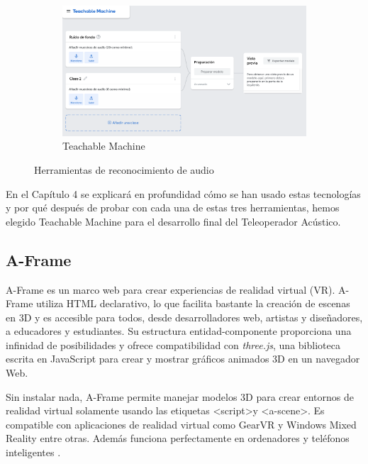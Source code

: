\begin{figure}[H]
\begin{subfigure}{.3\linewidth}
       \includegraphics[width=1\textwidth, height=0.7\textwidth]{chapters/images/tm.png}
        \caption{Teachable Machine}
    \end{subfigure}
    \caption{Herramientas de reconocimiento de audio}
\end{figure}


En el Capítulo 4 se explicará en profundidad cómo se han usado estas tecnologías y por qué después de probar con cada una de estas tres herramientas, hemos elegido Teachable Machine para el desarrollo final del Teleoperador Acústico.


\subsection{A-Frame}

A-Frame es un marco web para crear experiencias de realidad virtual (VR). A-Frame utiliza HTML declarativo, lo que facilita bastante la creación de escenas en 3D y es accesible para todos, desde desarrolladores web, artistas y diseñadores, a educadores y estudiantes. Su estructura entidad-componente proporciona una infinidad de posibilidades y ofrece compatibilidad con \textit{three.js}, una biblioteca  escrita en JavaScript para crear y mostrar gráficos animados 3D en un navegador Web. 

Sin instalar nada, A-Frame permite manejar modelos 3D para crear entornos de realidad virtual solamente usando las etiquetas \textless script\textgreater  y \textless a-scene\textgreater. Es compatible con aplicaciones de realidad virtual como GearVR y Windows Mixed Reality entre otras. Además funciona perfectamente en ordenadores y teléfonos inteligentes \cite{aframe}. 


